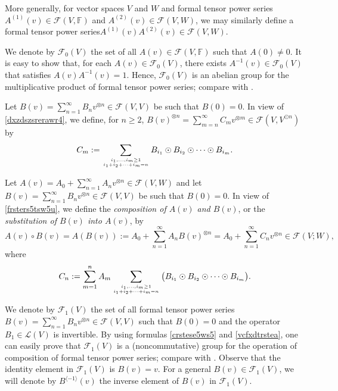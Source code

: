 \documentclass[12pt]{article}
\theoremstyle{remark}
\theoremstyle{remark}
\theoremstyle{remark}
\begin{document}
More generally, for vector spaces $V$ and $W$ and  formal tensor power series $A^{(1)}(v)\in\mathcal F(V,\mathbb F)$ and $A^{(2)}(v)\in\mathcal F(V,W)$, we may similarly define a formal tensor power series\linebreak $A^{(1)}(v)A^{(2)}(v)\in\mathcal F(V,W)$. 

We denote by $\mathcal F_0(V)$ the set of all $A(v)\in \mathcal F(V,\mathbb{F})$ such that $A(0)\neq 0$.  It is easy to show that, for each $A(v)\in\mathcal F_0(V)$,  there exists $A^{-1}(v)\in \mathcal F_0(V)$ that satisfies $A(v)A^{-1}(v)=1$. Hence,  $\mathcal F_0(V)$ is an abelian group for the multiplicative product of formal tensor power series; compare with \cite[Proposition~A.1]{FKLO}.

 Let $B(v)=\sum_{n=1}^\infty B_nv^{\otimes n}\in\mathcal F(V,V)$ be such that $B(0)=0$.  In view of \eqref{dxzdszsrerawr4}, we define, for 
 $n\ge2$, 
$B(v)^{\otimes n}=\sum_{m=n}^\infty C_m v^{\otimes m}\in\mathcal F(V,V^{\odot n})$ 
by 
\begin{equation}\label{frsters5tsw5u} C_m:= \sum_{i_1,\dots,i_m \geq 1 \atop i_1+i_2+\dots+i_m=n} B_{i_1}\odot B_{i_2}\odot \dots \odot B_{i_m}. \end{equation}

Let $A(v)=A_0+\sum_{n=1}^\infty A_nv^{\otimes n}\in\mathcal F(V,W)$ and let $B(v)=\sum_{n=1}^\infty B_nv^{\otimes n}\in\mathcal F(V,V)$ be such that $B(0)=0$. In view of \eqref{frsters5tsw5u}, we define the  {\it composition of $A(v)$ and $B(v)$}, or the {\it substitution of $B(v)$ into $A(v)$}, by 
\begin{equation}\label{crstese5ws5}
A(v)\circ B(v)=A(B(v)):=A_0+\sum_{n=1}^\infty A_n B(v)^{\otimes n}=A_0+\sum_{n=1}^\infty C_nv^{\otimes n}
\in\mathcal F(V;W),
\end{equation}
where
\begin{equation}\label{vcfxdtrstea}
C_n:=\sum_{m=1}^n A_m \sum_{i_1,\dots,i_m \geq 1 \atop i_1+i_2+\dots+i_m=n} \big(B_{i_1}\odot B_{i_2}\odot \dots \odot B_{i_m}\big).\end{equation}



We denote by $\mathcal F_1(V)$ the set of all formal tensor power series $B(v)=\sum_{n=1}^\infty B_nv^{\otimes n}\in\mathcal F(V,V)$ such that $B(0)=0$ and the operator $B_1\in\mathcal L(V)$ is invertible.  By using formulas \eqref{crstese5ws5} and \eqref{vcfxdtrstea}, one can easily prove that $\mathcal F_1(V)$ is a (noncommutative) group for the operation of composition of formal tensor power series; compare with \cite[Proposition~A.11]{FKLO}. Observe that the identity element in $\mathcal F_1(V)$ is $B(v)=v$. For a general $B(v)\in\mathcal F_1(V)$, we will denote by $B^{\langle-1\rangle}(v)$ the inverse element of $B(v)$ in $\mathcal F_1(V)$. 
\end{document}
